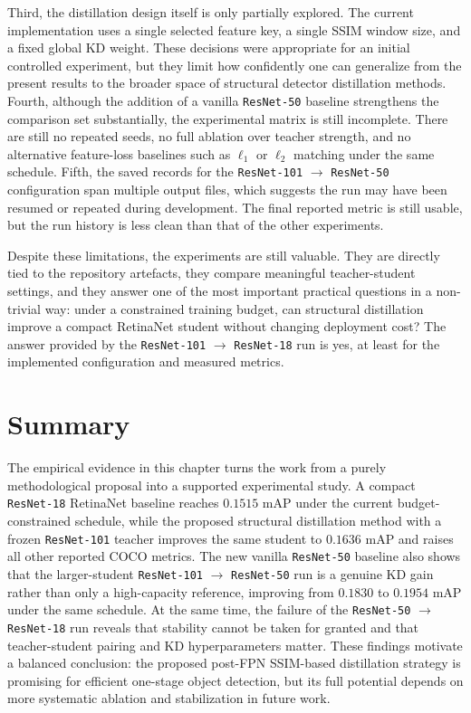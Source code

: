 Third, the distillation design itself is only partially explored. The current implementation uses a single selected feature key, a single SSIM window size, and a fixed global KD weight. These decisions were appropriate for an initial controlled experiment, but they limit how confidently one can generalize from the present results to the broader space of structural detector distillation methods. Fourth, although the addition of a vanilla \texttt{ResNet-50} baseline strengthens the comparison set substantially, the experimental matrix is still incomplete. There are still no repeated seeds, no full ablation over teacher strength, and no alternative feature-loss baselines such as $\ell_1$ or $\ell_2$ matching under the same schedule. Fifth, the saved records for the \texttt{ResNet-101} $\rightarrow$ \texttt{ResNet-50} configuration span multiple output files, which suggests the run may have been resumed or repeated during development. The final reported metric is still usable, but the run history is less clean than that of the other experiments.

Despite these limitations, the experiments are still valuable. They are directly tied to the repository artefacts, they compare meaningful teacher-student settings, and they answer one of the most important practical questions in a non-trivial way: under a constrained training budget, can structural distillation improve a compact RetinaNet student without changing deployment cost? The answer provided by the \texttt{ResNet-101} $\rightarrow$ \texttt{ResNet-18} run is yes, at least for the implemented configuration and measured metrics.

\section{Summary}

The empirical evidence in this chapter turns the work from a purely methodological proposal into a supported experimental study. A compact \texttt{ResNet-18} RetinaNet baseline reaches $0.1515$ mAP under the current budget-constrained schedule, while the proposed structural distillation method with a frozen \texttt{ResNet-101} teacher improves the same student to $0.1636$ mAP and raises all other reported COCO metrics. The new vanilla \texttt{ResNet-50} baseline also shows that the larger-student \texttt{ResNet-101} $\rightarrow$ \texttt{ResNet-50} run is a genuine KD gain rather than only a high-capacity reference, improving from $0.1830$ to $0.1954$ mAP under the same schedule. At the same time, the failure of the \texttt{ResNet-50} $\rightarrow$ \texttt{ResNet-18} run reveals that stability cannot be taken for granted and that teacher-student pairing and KD hyperparameters matter. These findings motivate a balanced conclusion: the proposed post-FPN SSIM-based distillation strategy is promising for efficient one-stage object detection, but its full potential depends on more systematic ablation and stabilization in future work.
